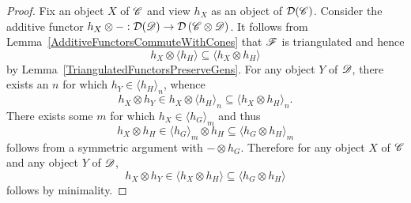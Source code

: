 \documentclass[dissertation.tex]{subfiles}
\begin{document}
\begin{thm}
\begin{proof}
    Fix an object $X$ of $\mathscr{C}$ and view $h_X$ as an object of $\mathcal{D}(\mathscr{C})$.
    Consider the additive functor $h_X \otimes -: \mathcal{D}(\mathscr{D}) \to \mathcal{D}\left(\mathscr{C} \otimes \mathscr{D}\right)$. %
    It follows from Lemma~\ref{AdditiveFunctorsCommuteWithCones} that $\mathscr{F}$ is triangulated and hence 
    $$h_X \otimes \langle h_H \rangle \subseteq \langle h_X \otimes h_H \rangle$$
    by Lemma~\ref{TriangulatedFunctorsPreserveGens}.
    For any object $Y$ of $\mathscr{D}$, there exists an $n$ for which $h_Y \in \langle h_H \rangle_n$, whence
    $$h_X \otimes h_Y \in h_X \otimes \langle h_H\rangle_n \subseteq \langle h_X \otimes h_H\rangle_n.$$
    There exists some $m$ for which $h_X \in \langle h_G \rangle_m$ and thus
    $$h_X \otimes h_H \in \langle h_G \rangle_m \otimes h_H \subseteq \langle h_G \otimes h_H \rangle_m$$
    follows from a symmetric argument with $- \otimes h_G$.
    Therefore for any object $X$ of $\mathscr{C}$ and any object $Y$ of $\mathscr{D}$,
    $$h_X \otimes h_Y \in \langle h_X \otimes h_H \rangle \subseteq \langle h_G \otimes h_H\rangle$$
    follows by minimality.
  \end{proof}
\end{thm}
\end{document}
